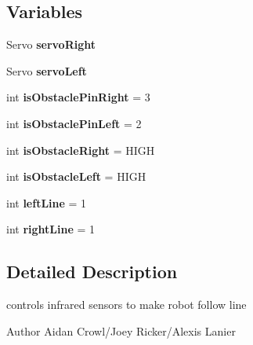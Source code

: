 \subsection*{Variables}
\begin{DoxyCompactItemize}
\item 
\mbox{\label{IRModule__Line_8ino_adbb774c5273f14bafa2a2ecb0f87723f}} 
Servo {\bfseries servo\+Right}
\item 
\mbox{\label{IRModule__Line_8ino_aa9868e91d1d76414c9a127f46e703356}} 
Servo {\bfseries servo\+Left}
\item 
\mbox{\label{IRModule__Line_8ino_a7643bc1bb6c5108eab39eb4994cba2eb}} 
int {\bfseries is\+Obstacle\+Pin\+Right} = 3
\item 
\mbox{\label{IRModule__Line_8ino_ad680a8533fda4591420989e7a384755b}} 
int {\bfseries is\+Obstacle\+Pin\+Left} = 2
\item 
\mbox{\label{IRModule__Line_8ino_ad7da1bca923948ca04152885ef7c1a00}} 
int {\bfseries is\+Obstacle\+Right} = H\+I\+GH
\item 
\mbox{\label{IRModule__Line_8ino_a4191e9df94e3df0bb0b25ec25ce2d26b}} 
int {\bfseries is\+Obstacle\+Left} = H\+I\+GH
\item 
\mbox{\label{IRModule__Line_8ino_a4eba15540f3d848a47b20bb86cdb4773}} 
int {\bfseries left\+Line} = 1
\item 
\mbox{\label{IRModule__Line_8ino_aeb8cf682644b7374c3169dd677b431eb}} 
int {\bfseries right\+Line} = 1
\end{DoxyCompactItemize}


\subsection{Detailed Description}
controls infrared sensors to make robot follow line 

\begin{DoxyAuthor}{Author}
Aidan Crowl/\+Joey Ricker/\+Alexis Lanier 
\end{DoxyAuthor}


